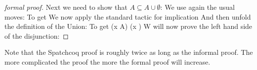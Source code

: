 \begin{proof}[formal proof]
Next we need to show that $A \subseteq A\cup \emptyset$:
We use again the usual moves:
To get 
We now apply the standard tactic for implication
And then unfold the definition of the Union:
To get 
  {(x \in A) \lor (x \in \emptyset)}
W will now prove the left hand side of the disjunction:
\end{proof}

Note that the Spatchcoq proof is roughly twice as long as the informal proof. The more complicated the proof the more the formal proof will increase.


